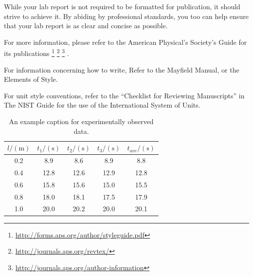 \documentclass[
    10pt,aps,prl,
    amsfonts,
    amssymb,
    amsmath,
    runinaddress,
    secnum,
    showkeys,
    superscriptaddress,
    twocolumn,
]{revtex4}
\begin{document}
    While your lab report is not required to be formatted for
        publication, it should strive to achieve it.
    By abiding by professional standards, you too can help ensure
        that your lab report is as clear and concise as possible.
   
    For more information, please refer to the American Physical's
        Society's Guide for its publications
    \footnote{\url{http://forms.aps.org/author/styleguide.pdf}}
    \footnote{\url{http://journals.aps.org/revtex/}}
    \footnote{\url{http://journals.aps.org/author-information}}
    \cite{Simon:2010:SIGCSE}
    \cite{PeerInstruction}.

    For information concerning how to write,
        Refer to the Mayfield Manual\cite{Mayfield},
        or the Elements of Style\cite{StrunkWilliam}.

    For unit style conventions, refer to the ``Checklist for Reviewing Manuscripts''
        in The NIST Guide for the use of the International System of Units\cite{NISTsp811}.

    \begin{table}[h]
        \begin{ruledtabular}
        \begin{tabular}{c|ccc|c}
            $l/(\si{\meter})$ &
            $t_1/(\si{\second})$ &
            $t_2/(\si{\second})$ &
            $t_3/(\si{\second})$ &
            $t_{ave}/(\si{\second})$ \\
            \hline
            0.2 &  8.9 &  8.6 &  8.9 &  8.8 \\
            0.4 & 12.8 & 12.6 & 12.9 & 12.8 \\
            0.6 & 15.8 & 15.6 & 15.0 & 15.5 \\
            0.8 & 18.0 & 18.1 & 17.5 & 17.9 \\
            1.0 & 20.0 & 20.2 & 20.0 & 20.1 \\
        \end{tabular}
        \end{ruledtabular}
        \caption{An example caption for experimentally observed data.}
        \label{tab:data}
    \end{table}
\end{document}
